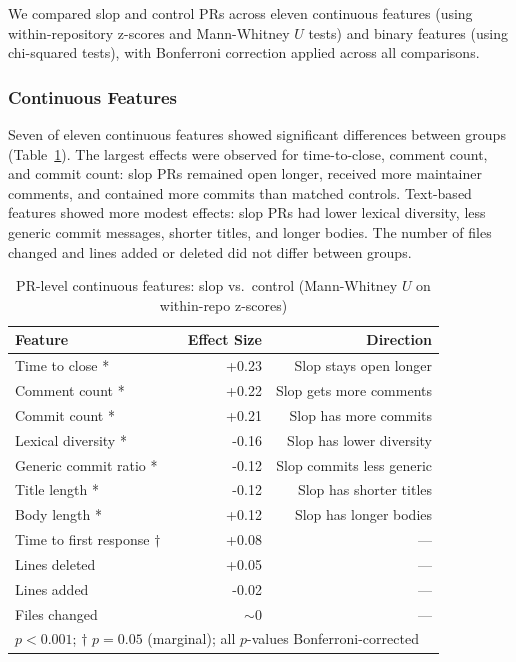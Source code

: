 \documentclass[11pt]{article}
\begin{document}
	We compared slop and control PRs across eleven continuous features (using within-repository z-scores and Mann-Whitney $U$ tests) and binary features (using chi-squared tests), with Bonferroni correction applied across all comparisons.
	
	\subsubsection{Continuous Features}
	
	Seven of eleven continuous features showed significant differences between groups (Table~\ref{tab:rq1-continuous}). The largest effects were observed for time-to-close, comment count, and commit count: slop PRs remained open longer, received more maintainer comments, and contained more commits than matched controls. Text-based features showed more modest effects: slop PRs had lower lexical diversity, less generic commit messages, shorter titles, and longer bodies. The number of files changed and lines added or deleted did not differ between groups.
	
	\begin{table}[ht]
		\centering
		\caption{PR-level continuous features: slop vs.\ control (Mann-Whitney $U$ on within-repo z-scores)}
		\label{tab:rq1-continuous}
		\begin{tabular}{lrr}
			\toprule
			\textbf{Feature} & \textbf{Effect Size} & \textbf{Direction} \\
			\midrule
			Time to close *\ \ \,         & +0.23 & Slop stays open longer \\
			Comment count *\ \ \,          & +0.22 & Slop gets more comments \\
			Commit count *\ \ \,          & +0.21 & Slop has more commits \\
			Lexical diversity *\ \ \,      & -0.16 & Slop has lower diversity \\
			Generic commit ratio *\ \ \,  & -0.12 & Slop commits less generic \\
			Title length *\ \ \,          & -0.12 & Slop has shorter titles \\
			Body length *\ \ \,           & +0.12 & Slop has longer bodies \\
			Time to first response $\dagger$\, & +0.08 & --- \\
			Lines deleted             & +0.05 & --- \\
			Lines added               & -0.02 & --- \\
			Files changed             & $\sim 0$ & --- \\
			\bottomrule
			\multicolumn{3}{l}{\small * $p < 0.001$; $\dagger$ $p = 0.05$ (marginal); all $p$-values Bonferroni-corrected} \\
		\end{tabular}
	\end{table}
	
\end{document}
